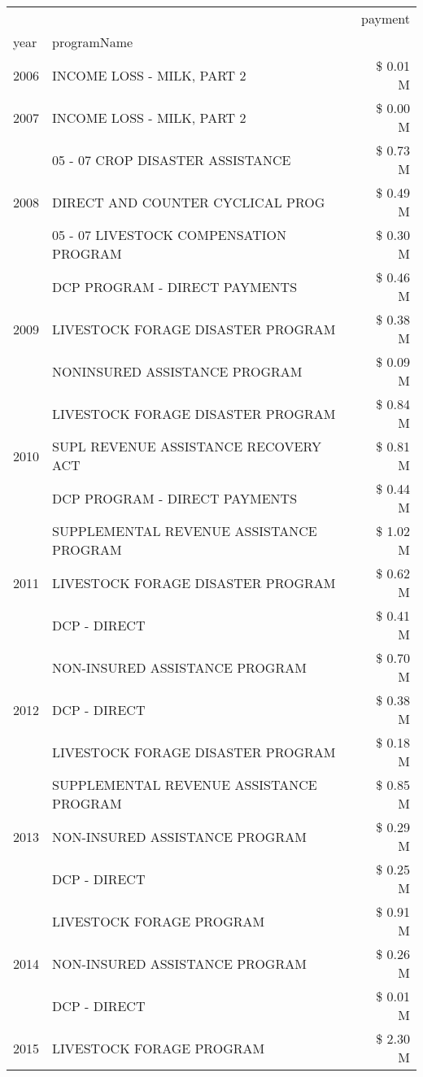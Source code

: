 \begin{tabular}{llr}
\toprule
 &  & payment \\
year & programName &  \\
\midrule
2006 & INCOME LOSS - MILK, PART 2 & \$ 0.01 M \\
\cline{1-3}
2007 & INCOME LOSS - MILK, PART 2 & \$ 0.00 M \\
\cline{1-3}
\multirow[t]{3}{*}{2008} & 05 - 07 CROP DISASTER ASSISTANCE & \$ 0.73 M \\
 & DIRECT AND COUNTER CYCLICAL PROG & \$ 0.49 M \\
 & 05 - 07 LIVESTOCK COMPENSATION PROGRAM & \$ 0.30 M \\
\cline{1-3}
\multirow[t]{3}{*}{2009} & DCP PROGRAM - DIRECT PAYMENTS & \$ 0.46 M \\
 & LIVESTOCK FORAGE DISASTER  PROGRAM & \$ 0.38 M \\
 & NONINSURED ASSISTANCE PROGRAM & \$ 0.09 M \\
\cline{1-3}
\multirow[t]{3}{*}{2010} & LIVESTOCK FORAGE DISASTER  PROGRAM & \$ 0.84 M \\
 & SUPL REVENUE ASSISTANCE RECOVERY ACT & \$ 0.81 M \\
 & DCP PROGRAM - DIRECT PAYMENTS & \$ 0.44 M \\
\cline{1-3}
\multirow[t]{3}{*}{2011} & SUPPLEMENTAL REVENUE ASSISTANCE PROGRAM & \$ 1.02 M \\
 & LIVESTOCK FORAGE DISASTER PROGRAM & \$ 0.62 M \\
 & DCP - DIRECT & \$ 0.41 M \\
\cline{1-3}
\multirow[t]{3}{*}{2012} & NON-INSURED ASSISTANCE PROGRAM & \$ 0.70 M \\
 & DCP - DIRECT & \$ 0.38 M \\
 & LIVESTOCK FORAGE DISASTER PROGRAM & \$ 0.18 M \\
\cline{1-3}
\multirow[t]{3}{*}{2013} & SUPPLEMENTAL REVENUE ASSISTANCE PROGRAM & \$ 0.85 M \\
 & NON-INSURED ASSISTANCE PROGRAM & \$ 0.29 M \\
 & DCP - DIRECT & \$ 0.25 M \\
\cline{1-3}
\multirow[t]{3}{*}{2014} & LIVESTOCK FORAGE PROGRAM & \$ 0.91 M \\
 & NON-INSURED ASSISTANCE PROGRAM & \$ 0.26 M \\
 & DCP - DIRECT & \$ 0.01 M \\
\cline{1-3}
\multirow[t]{3}{*}{2015} & LIVESTOCK FORAGE PROGRAM & \$ 2.30 M \\

\end{tabular}
